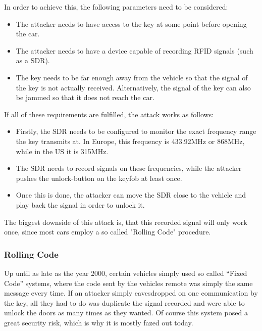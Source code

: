 \begin{itemize}
In order to achieve this, the following parameters need to be considered:
\begin{itemize}
    \item The attacker needs to have access to the key at some point before opening the car. 
    \item The attacker needs to have a device capable of recording RFID signals (such as a SDR).
    \item The key needs to be far enough away from the vehicle so that the signal of the key is not actually received. Alternatively, the signal of the key can also be jammed so that it does not reach the car.
\end{itemize}

If all of these requirements are fulfilled, the attack works as follows:
\begin{itemize}
    \item Firstly, the SDR needs to be configured to monitor the exact frequency range the key transmits at. In Europe, this frequency is 433.92MHz or 868MHz, while in the US it is 315MHz.\cite{keyfobfrequencies}
    \item The SDR needs to record signals on these frequencies, while the attacker pushes the unlock-button on the keyfob at least once. 
    \item Once this is done, the attacker can move the SDR close to the vehicle and play back the signal in order to unlock it.
\end{itemize}

The biggest downside of this attack is, that this recorded signal will only work once, since most cars employ a so called "Rolling Code" procedure.

\subsubsection{Rolling Code}
Up until as late as the year 2000, certain vehicles simply used so called ``Fixed Code'' systems, where the code sent by the vehicles remote was simply the same message every time. If an attacker simply eavesdropped on one communication by the key, all they had to do was duplicate the signal recorded and were able to unlock the doors as many times as they wanted.
Of course this system posed a great security risk, which is why it is mostly fazed out today.



\end{itemize}

